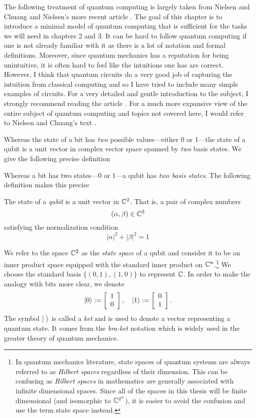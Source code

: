    The following treatment of quantum computing is largely taken from Nielsen and Chuang \cite{Nielsen&Chuang} and 
   Nielsen's more recent article \cite{QC}.  The goal of this chapter is to introduce a minimal model of quantum 
   computing that is sufficient for the tasks we will need in chapters 2 and 3. It can be hard to follow quantum 
   computing if one is not already familiar with it as there is a lot of notation and formal definitions. Moreover, 
   since quantum mechanics has a reputation for being unintuitive, it is often hard to feel like the intuitions one 
   has are correct.  However, I think that quantum circuits do a very good job of capturing the intuition from 
   classical computing and so I have tried to include many simple examples of circuits. For a very detailed and 
   gentle introduction to the subject, I strongly recommend reading the article \cite{QC}. For a much more 
   expansive view of the entire subject of quantum computing and topics not covered here, I would refer to Nielsen 
   and Chuang's text \cite{Nielsen&Chuang}.  
        
        Whereas the state of a bit has \emph{two} possible values---either 0 or 1---the state of a qubit is a unit
        vector in complex vector space spanned by \emph{two} basis states. We give the following precise definition

        Whereas a bit has two states---0 or 1---a qubit has \emph{two basis states}. The following definition makes 
        this precise
        \begin{definition}
            The state of a \emph{qubit} is a unit vector in $\mathbb{C}^2$. That is, a pair of complex numbers
            \[
                (\alpha, \beta) \in \mathbb{C}^2
            \]
            satisfying the normalization condition %
            \[
                |\alpha|^2 + |\beta|^2 = 1
            \]
        \end{definition}
        
        We refer to the space $\mathbb{C}^2$ as the \emph{state space} of a qubit and consider it to be an inner product 
        space equipped with the standard inner product on $\mathbb{C}^n$.\footnote{In quantum mechanics literature, state 
            spaces of quantum systems are always referred to as \emph{Hilbert spaces} regardless of their 
            dimension. This can be confusing as \emph{Hilbert spaces} in mathematics are generally associated with 
        infinite dimensional spaces. Since all of the spaces in this thesis will be finite dimensional (and 
    isomorphic to $\mathbb{C}^{2^n}$), it is easier to avoid the confusion and use the term state space instead.}
    We choose the standard basis $\{(0,1), (1,0)\}$ to represent $\mathbb{C}$. In order to make the analogy with bits more 
    clear, we denote \[
            \ket{0} := \left[\begin{array}{r}1\\0\end{array}\right], \quad
            \ket{1} := \left[\begin{array}{r}0\\1\end{array}\right].
         \] The symbol $\ket{\ }$ is called a \emph{ket} and is used to denote a vector representing a quantum 
         state. It comes from the \emph{bra-ket} notation which is widely used in the greater theory of quantum 
         mechanics.
        
